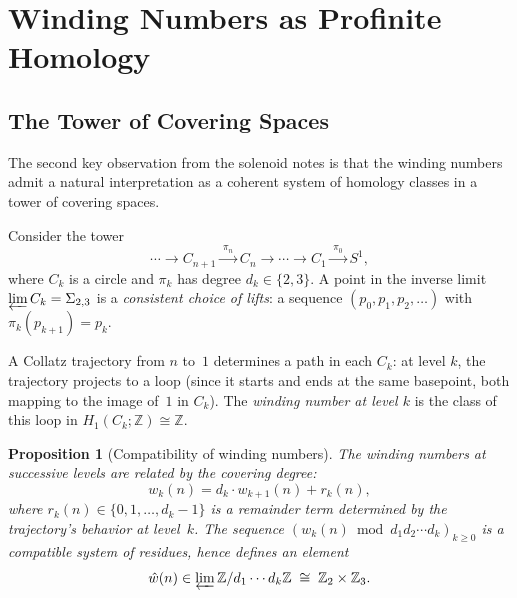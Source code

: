 \documentclass[11pt,a4paper]{article}
\newcommand{\Z}{\mathbb{Z}}
\theoremstyle{plain}
\newtheorem{proposition}[theorem]{Proposition}
\theoremstyle{definition}
\begin{document}
\section{Winding Numbers as Profinite Homology}\label{sec:profinite-homology}

\subsection{The Tower of Covering Spaces}

The second key observation from the solenoid notes is that the winding numbers admit a natural interpretation as a coherent system of homology classes in a tower of covering spaces.

Consider the tower
\begin{equation}\label{eq:covering-tower}
    \cdots \to C_{n+1} \xrightarrow{\;\pi_n\;} C_n \to \cdots \to C_1 \xrightarrow{\;\pi_0\;} S^1,
\end{equation}
where $C_k$ is a circle and $\pi_k$ has degree $d_k \in \{2, 3\}$. A point in the inverse limit $\varprojlim C_k = \Sigma_{2,3}$ is a \emph{consistent choice of lifts}: a sequence $(p_0, p_1, p_2, \ldots)$ with $\pi_k(p_{k+1}) = p_k$.

A Collatz trajectory from $n$ to~$1$ determines a path in each $C_k$: at level $k$, the trajectory projects to a loop (since it starts and ends at the same basepoint, both mapping to the image of~$1$ in $C_k$). The \emph{winding number at level $k$} is the class of this loop in $H_1(C_k; \Z) \cong \Z$.

\begin{proposition}[Compatibility of winding numbers]\label{prop:winding-compat}
    The winding numbers at successive levels are related by the covering degree:
    \begin{equation}
        w_{k}(n) = d_k \cdot w_{k+1}(n) + r_k(n),
    \end{equation}
    where $r_k(n) \in \{0, 1, \ldots, d_k - 1\}$ is a remainder term determined by the trajectory's behavior at level~$k$. The sequence $(w_k(n) \bmod d_1 d_2 \cdots d_k)_{k \geq 0}$ is a compatible system of residues, hence defines an element
    \begin{equation}
        \hat{w}(n) \in \varprojlim \Z/d_1 \cdots d_k \Z \;\cong\; \Z_2 \times \Z_3.
    \end{equation}
\end{proposition}
\end{document}
